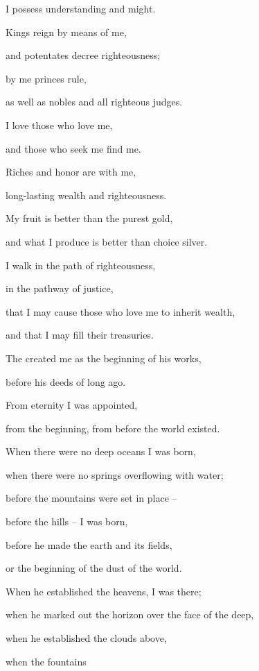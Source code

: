 {\par }{\Q I
possess understanding
and might.
\par }{\Q {}Kings
reign
by means of me,
\par }{\Q and potentates
decree righteousness;
\par }{\Q {}by me princes
rule,
\par }{\Q as well as nobles
and all
righteous judges.
\par }{\Q {}I
love
those who love
me,
\par }{\Q and those who seek
me find me.
\par }{\Q {}Riches
and honor
are with
me,
\par }{\Q long-lasting
wealth
and righteousness.
\par }{\Q {}My fruit
is better
than the purest
gold,
\par }{\Q and what I produce
is better than choice
silver.
\par }{\Q {}I walk
in
the path
of righteousness,
\par }{\Q in
the pathway
of justice,
\par }{\Q {}that I may cause those who love
me to inherit
wealth,
\par }{\Q and that I may
fill
their treasuries.
\par }{\Q {}The
{}
created
me as the beginning
of his works,
\par }{\Q before his deeds of long ago.
\par }{\Q {}From eternity
I was appointed,
\par }{\Q from the beginning,
from before
the world existed.
\par }{\Q {}When there were no
deep
oceans
I was born,
\par }{\Q when there were no
springs
overflowing
with water;
\par }{\Q {}before
the mountains
were set in place –
\par }{\Q before the hills – I was born,
\par }{\Q {}before
he made
the earth
and its fields,
\par }{\Q or the beginning
of the dust
of the world.
\par }{\Q {}When he established
the heavens,
I
was there;
\par }{\Q when he marked
out the horizon
over
the face
of the deep,
\par }{\Q {}when he established
the clouds
above,
\par }{\Q when the fountains
}
